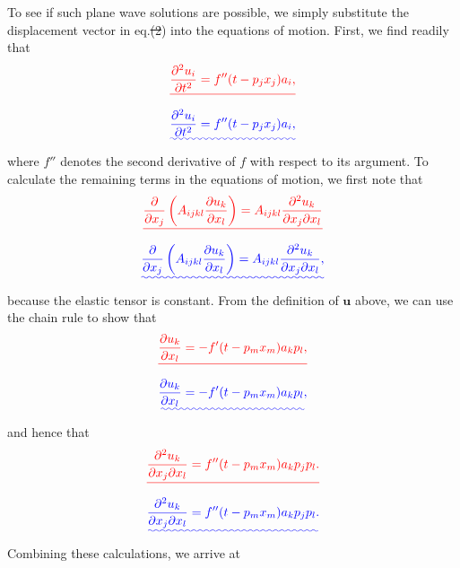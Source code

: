 \documentclass [a4paper,12pt]{paper}
\providecommand{\DIFadd}[1]{{\protect\color{blue}\uwave{#1}}} %
\providecommand{\DIFdel}[1]{{\protect\color{red}\sout{#1}}}                      %
\providecommand{\DIFaddbegin}{} %
\providecommand{\DIFaddend}{} %
\providecommand{\DIFdelbegin}{} %
\providecommand{\DIFdelend}{} %
\begin{document}
To see if such plane wave solutions are possible, we simply substitute the displacement vector in eq.\DIFdelbegin \DIFdel{(2}\DIFdelend \DIFaddbegin \DIFadd{~(\ref{eq:2}}\DIFaddend ) into the equations 
 of motion. First, we find readily that
\DIFdelbegin \begin{displaymath}
\DIFdel{\frac{\partial^{2}u_{i}}{\partial t^{2}}=f''(t-p_{j}x_{j})a_{i},
}\end{displaymath}%
\DIFdelend \DIFaddbegin \begin{equation}
\DIFadd{\frac{\partial^{2}u_{i}}{\partial t^{2}}=f''(t-p_{j}x_{j})a_{i},
\label{eq:5}
}\end{equation}\DIFaddend 
where $f''$ denotes the second derivative of $f$ with respect to its argument. To calculate the remaining terms in the equations 
of motion, we first note that
\DIFdelbegin \begin{displaymath}
\DIFdel{\frac{\partial}{\partial x_{j}}\left(A_{ijkl}\frac{\partial u_{k}}{\partial x_{l}}\right)=A_{ijkl}\frac{\partial^{2}u_{k}}{\partial x_{j}\partial x_{l}}
}\end{displaymath}%
\DIFdelend \DIFaddbegin \begin{equation}
\DIFadd{\frac{\partial}{\partial x_{j}}\left(A_{ijkl}\frac{\partial u_{k}}{\partial x_{l}}\right)=A_{ijkl}\frac{\partial^{2}u_{k}}{\partial x_{j}\partial x_{l}},
\label{eq:6}
}\end{equation}\DIFaddend 
because the elastic tensor is constant. From the definition of $\mathbf{u}$ above, we can use the chain rule to show that
\DIFdelbegin \begin{displaymath}
\DIFdel{\frac{\partial u_{k}}{\partial x_{l}}=-f'(t-p_{m}x_{m})a_{k}p_{l},
}\end{displaymath}%
\DIFdelend \DIFaddbegin \begin{equation}
\DIFadd{\frac{\partial u_{k}}{\partial x_{l}}=-f'(t-p_{m}x_{m})a_{k}p_{l},
\label{eq:7}
}\end{equation}\DIFaddend 
and hence that
\DIFdelbegin \begin{displaymath}
\DIFdel{\frac{\partial^{2}u_{k}}{\partial x_{j}\partial x_{l}}=f''(t-p_{m}x_{m})a_{k}p_{j}p_{l}.
}\end{displaymath}%
\DIFdelend \DIFaddbegin \begin{equation}
\DIFadd{\frac{\partial^{2}u_{k}}{\partial x_{j}\partial x_{l}}=f''(t-p_{m}x_{m})a_{k}p_{j}p_{l}.
\label{eq:8}
}\end{equation}\DIFaddend 
Combining these calculations, we arrive at
\end{document}
